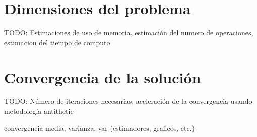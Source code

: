 \section{Dimensiones del problema}

TODO: Estimaciones de uso de memoria, estimaci\'on del numero de operaciones,
estimacion del tiempo de computo


\section{Convergencia de la soluci\'on}

TODO: N\'umero de iteraciones necesarias, aceleraci\'on de la convergencia
usando metodolog\'ia antithetic

convergencia media, varianza, var (estimadores, graficos, etc.)
